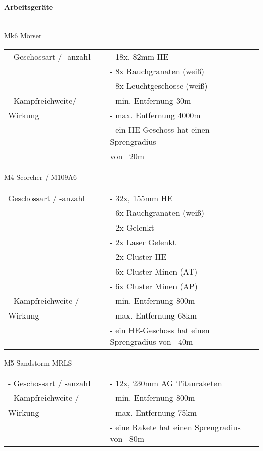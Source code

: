 \paragraph{Arbeitsgeräte} \hfil\\
	Mk6 Mörser
	\begin{longtable}{p{0.4\linewidth} p{0.6\linewidth} }
		- Geschossart / -anzahl  	& - 18x, 82mm HE \\
		 				& - 8x Rauchgranaten (weiß) \\
		 				& - 8x Leuchtgeschosse (weiß) \\
		- Kampfreichweite/  	& - min. Entfernung 30m \\
		Wirkung  			& - max. Entfernung 4000m \\
		 				& - ein HE-Geschoss hat einen Sprengradius \\
		 				& von ~20m \\
	\end{longtable}

	M4 Scorcher / M109A6
	\begin{longtable}{p{0.4\linewidth} p{0.6\linewidth} }
		Geschossart / -anzahl  	& - 32x, 155mm HE \\
						& - 6x Rauchgranaten (weiß) \\
						& - 2x Gelenkt \\
 						& - 2x Laser Gelenkt \\
 						& - 2x Cluster HE \\
 						& - 6x Cluster Minen (AT) \\
 						& - 6x Cluster Minen (AP) \\
		- Kampfreichweite /  	& - min. Entfernung 800m \\
		Wirkung  			& - max. Entfernung 68km \\
 						& - ein HE-Geschoss hat einen Sprengradius von ~40m \\
	\end{longtable}

	M5 Sandstorm MRLS
	\begin{longtable}{p{0.4\linewidth} p{0.6\linewidth} }
		- Geschossart / -anzahl  	& - 12x, 230mm AG Titanraketen \\
		- Kampfreichweite / 	& - min. Entfernung 800m \\
		Wirkung  			& - max. Entfernung 75km \\
						& - eine Rakete hat einen Sprengradius von ~80m \\
	\end{longtable}

